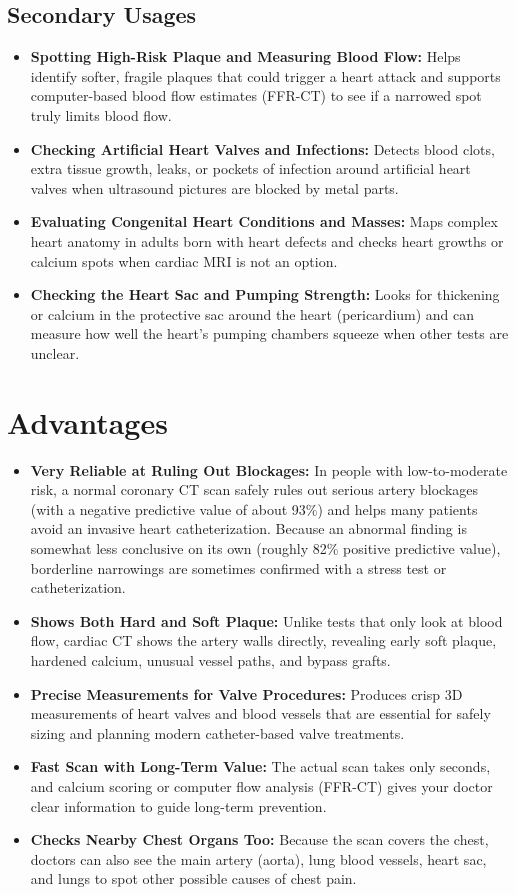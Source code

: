 \subsection{Secondary Usages}
\begin{itemize}
    \item \textbf{Spotting High-Risk Plaque and Measuring Blood Flow:} Helps identify softer, fragile plaques that could trigger a heart attack and supports computer-based blood flow estimates (FFR-CT) to see if a narrowed spot truly limits blood flow.
    \item \textbf{Checking Artificial Heart Valves and Infections:} Detects blood clots, extra tissue growth, leaks, or pockets of infection around artificial heart valves when ultrasound pictures are blocked by metal parts.
    \item \textbf{Evaluating Congenital Heart Conditions and Masses:} Maps complex heart anatomy in adults born with heart defects and checks heart growths or calcium spots when cardiac MRI is not an option.
    \item \textbf{Checking the Heart Sac and Pumping Strength:} Looks for thickening or calcium in the protective sac around the heart (pericardium) and can measure how well the heart's pumping chambers squeeze when other tests are unclear.
\end{itemize}

\section{Advantages}
\begin{itemize}
    \item \textbf{Very Reliable at Ruling Out Blockages:} In people with low-to-moderate risk, a normal coronary CT scan safely rules out serious artery blockages (with a negative predictive value of about 93\%) and helps many patients avoid an invasive heart catheterization. Because an abnormal finding is somewhat less conclusive on its own (roughly 82\% positive predictive value), borderline narrowings are sometimes confirmed with a stress test or catheterization.
    \item \textbf{Shows Both Hard and Soft Plaque:} Unlike tests that only look at blood flow, cardiac CT shows the artery walls directly, revealing early soft plaque, hardened calcium, unusual vessel paths, and bypass grafts.
    \item \textbf{Precise Measurements for Valve Procedures:} Produces crisp 3D measurements of heart valves and blood vessels that are essential for safely sizing and planning modern catheter-based valve treatments.
    \item \textbf{Fast Scan with Long-Term Value:} The actual scan takes only seconds, and calcium scoring or computer flow analysis (FFR-CT) gives your doctor clear information to guide long-term prevention.
    \item \textbf{Checks Nearby Chest Organs Too:} Because the scan covers the chest, doctors can also see the main artery (aorta), lung blood vessels, heart sac, and lungs to spot other possible causes of chest pain.
\end{itemize}

